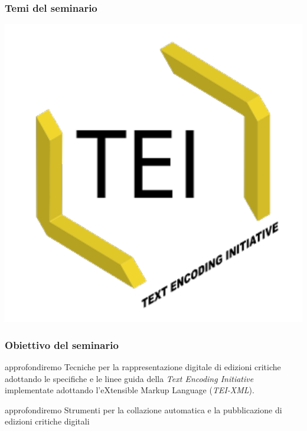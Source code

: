 \documentclass{beamer}
\begin{document}


\begin{frame}
	\frametitle{Temi del seminario}
	\addtocounter{nframe}{1}

	\begin{center}
		\includegraphics[width=.5\textwidth]{imgs/tei-r.pdf}
	\end{center}

\end{frame}

\begin{frame}
	\frametitle{Obiettivo del seminario}
	\addtocounter{nframe}{1}

	\begin{block}{approfondiremo}
		Tecniche per la rappresentazione digitale di edizioni critiche adottando le specifiche e le linee guida della \textit{Text Encoding Initiative} implementate adottando l'eXtensible Markup Language (\textit{TEI-XML}).
	\end{block}
	\begin{block}{approfondiremo}
		Strumenti per la collazione automatica e la pubblicazione di edizioni critiche digitali
	\end{block}

\end{frame}
\end{document}
